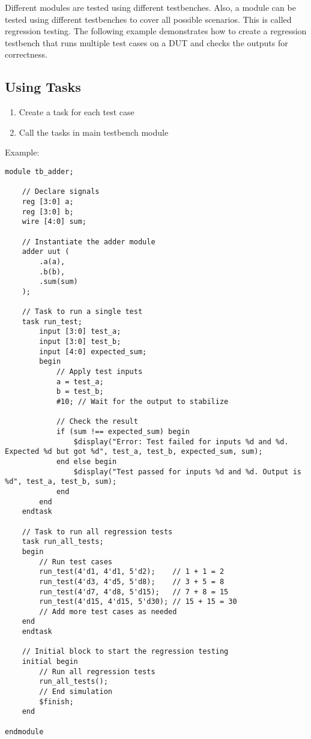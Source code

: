 \documentclass{report}
\begin{document}
Different modules are tested using different testbenches. Also, a module can be tested using different testbenches to cover all possible scenarios. This is called regression testing. The following example demonstrates how to create a regression testbench that runs multiple test cases on a DUT and checks the outputs for correctness.
\subsection{Using Tasks}
\begin{enumerate}
    \item Create a task for each test case
    \item Call the tasks in main testbench module
\end{enumerate}
Example:
\begin{verbatim}
module tb_adder;

    // Declare signals
    reg [3:0] a;
    reg [3:0] b;
    wire [4:0] sum;

    // Instantiate the adder module
    adder uut (
        .a(a),
        .b(b),
        .sum(sum)
    );

    // Task to run a single test
    task run_test;
        input [3:0] test_a;
        input [3:0] test_b;
        input [4:0] expected_sum;
        begin
            // Apply test inputs
            a = test_a;
            b = test_b;
            #10; // Wait for the output to stabilize

            // Check the result
            if (sum !== expected_sum) begin
                $display("Error: Test failed for inputs %d and %d. Expected %d but got %d", test_a, test_b, expected_sum, sum);
            end else begin
                $display("Test passed for inputs %d and %d. Output is %d", test_a, test_b, sum);
            end
        end
    endtask

    // Task to run all regression tests
    task run_all_tests;
    begin
        // Run test cases
        run_test(4'd1, 4'd1, 5'd2);    // 1 + 1 = 2
        run_test(4'd3, 4'd5, 5'd8);    // 3 + 5 = 8
        run_test(4'd7, 4'd8, 5'd15);   // 7 + 8 = 15
        run_test(4'd15, 4'd15, 5'd30); // 15 + 15 = 30
        // Add more test cases as needed
    end
    endtask

    // Initial block to start the regression testing
    initial begin
        // Run all regression tests
        run_all_tests();
        // End simulation
        $finish;
    end

endmodule
\end{verbatim}
\end{document}
